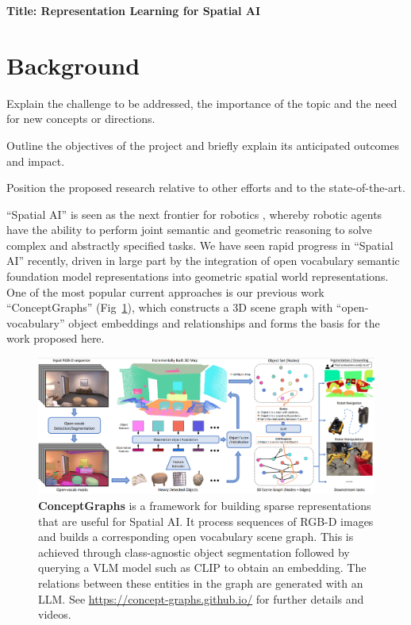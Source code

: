 \documentclass[english,
]{nserc-alliance}
\newcommand{\proposaltitle}{Representation Learning for Spatial AI}
\begin{document}
\thispagestyle{firstpage}
\maketitle

\noindent \textbf{Title: \proposaltitle}

\section*{Background}
\ifinst\begin{instructions}
  \item Explain the challenge to be addressed, the importance of the topic and the need for new concepts or directions. 
  \item Outline the objectives of the project and briefly explain its anticipated outcomes and impact. 
  \item Position the proposed research relative to other efforts and to the state-of-the-art.
\end{instructions}\fi

``Spatial AI'' is seen as the next frontier for robotics \cite{future-mapping}, whereby robotic agents have the ability to perform joint semantic and geometric reasoning to solve complex and abstractly specified tasks. 
We have seen rapid progress in ``Spatial AI'' recently, driven in large part by the integration of open vocabulary semantic foundation model representations into geometric spatial world representations. One of the most popular current approaches is our previous work ``ConceptGraphs'' \cite{concept-graphs} (Fig~\ref{fig:concept-graph}), which constructs a 3D scene graph \cite{3Dscenegraph} with ``open-vocabulary'' object embeddings and relationships and forms the basis for the work proposed here.

\begin{figure}[h!]
    \centering
    \includegraphics[width=0.8\linewidth]{images/concept-graphs-pipeline.png}
    \caption{\textbf{ConceptGraphs} is a framework for building sparse representations that are useful for Spatial AI. It process sequences of RGB-D images and builds a corresponding open vocabulary scene graph. This is achieved through class-agnostic object segmentation followed by querying a VLM model such as CLIP \cite{clip} to obtain an embedding. The relations between these entities in the graph are generated with an LLM.  See \url{https://concept-graphs.github.io/} for further details and videos. }
    \label{fig:concept-graph}
\end{figure}
\end{document}
